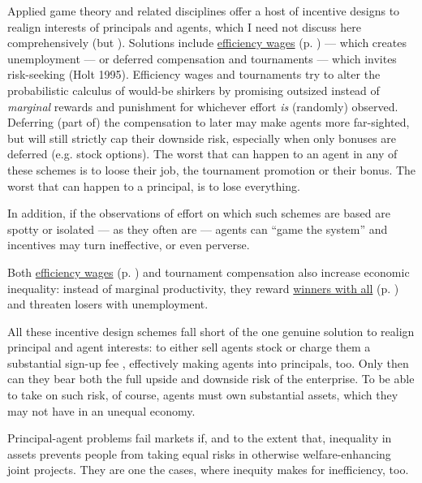 Applied game theory and related disciplines offer a host of incentive designs to realign interests of principals and agents, which I need not discuss here comprehensively (but \citealt{Tirole2006}). Solutions include \hyperref[sec:efficiencywages]{efficiency wages} (p. \pageref{sec:efficiencywages}) --- which creates unemployment --- or deferred compensation and tournaments --- which invites risk-seeking (Holt 1995). Efficiency wages and tournaments try to alter the probabilistic calculus of would-be shirkers by promising outsized instead of \emph{marginal} rewards and punishment for whichever effort \emph{is} (randomly) observed. Deferring (part of) the compensation to later may make agents more far-sighted, but will still strictly cap their downside risk, especially when only bonuses are deferred (e.g. stock options). The worst that can happen to an agent in any of these schemes is to loose their job, the tournament promotion or their bonus. The worst that can happen to a principal, is to lose everything.

In addition, if the observations of effort on which such schemes are based are spotty or isolated --- as they often are --- agents can ``game the system'' and incentives may turn ineffective, or even perverse. 

Both \hyperref[sec:efficiencywages]{efficiency wages} (p. \pageref{sec:efficiencywages}) and tournament compensation also increase economic inequality: instead of marginal productivity, they reward \hyperref[sec:winner-take-all]{winners with all} (p. \pageref{sec:winner-take-all}) and threaten losers with unemployment.

All these incentive design schemes fall short of the one genuine solution to realign principal and agent interests: to either sell agents stock or charge them a substantial sign-up fee \citep{Tirole2006}, effectively making agents into principals, too. Only then can they bear both the full upside and downside risk of the enterprise. To be able to take on such risk, of course, agents must own substantial assets, which they may not have in an unequal economy.

Principal-agent problems fail markets if, and to the extent that, inequality in assets prevents people from taking equal risks in otherwise welfare-enhancing joint projects. They are one the cases, where inequity makes for inefficiency, too. %

